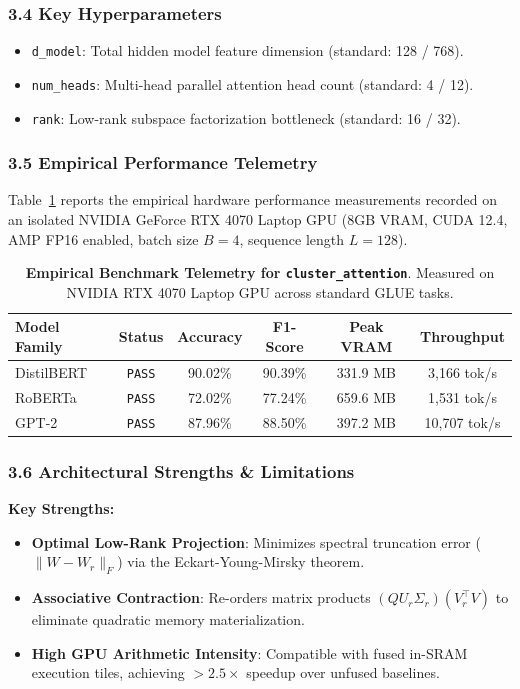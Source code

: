 \subsubsection*{3.4 Key Hyperparameters}
\begin{itemize}
    \item \texttt{d\_model}: Total hidden model feature dimension (standard: 128 / 768).
    \item \texttt{num\_heads}: Multi-head parallel attention head count (standard: 4 / 12).
    \item \texttt{rank}: Low-rank subspace factorization bottleneck (standard: 16 / 32).
\end{itemize}

\subsubsection*{3.5 Empirical Performance Telemetry}
Table~\ref{tab:telemetry_cluster_attention} reports the empirical hardware performance measurements recorded on an isolated NVIDIA GeForce RTX 4070 Laptop GPU (8GB VRAM, CUDA 12.4, AMP FP16 enabled, batch size $B=4$, sequence length $L=128$).

\begin{table}[h]
\centering
\small
\caption{\textbf{Empirical Benchmark Telemetry for \texttt{cluster\_attention}}. Measured on NVIDIA RTX 4070 Laptop GPU across standard GLUE tasks.}
\label{tab:telemetry_cluster_attention}
\begin{tabular*}{\columnwidth}{@{\extracolsep{\fill}}lccccc}
\toprule
\textbf{Model Family} & \textbf{Status} & \textbf{Accuracy} & \textbf{F1-Score} & \textbf{Peak VRAM} & \textbf{Throughput} \\
\midrule
DistilBERT & \texttt{PASS} & 90.02\% & 90.39\% & 331.9 MB & 3,166 tok/s \\
RoBERTa    & \texttt{PASS} & 72.02\% & 77.24\% & 659.6 MB & 1,531 tok/s \\
GPT-2      & \texttt{PASS} & 87.96\% & 88.50\% & 397.2 MB & 10,707 tok/s \\
\bottomrule
\end{tabular*}
\end{table}

\subsubsection*{3.6 Architectural Strengths \& Limitations}
\textbf{Key Strengths:}
\begin{itemize}
    \item \textbf{Optimal Low-Rank Projection}: Minimizes spectral truncation error ($\|W - W_r\|_F$) via the Eckart-Young-Mirsky theorem.
    \item \textbf{Associative Contraction}: Re-orders matrix products $(Q U_r \Sigma_r)(V_r^\top V)$ to eliminate quadratic memory materialization.
    \item \textbf{High GPU Arithmetic Intensity}: Compatible with fused in-SRAM execution tiles, achieving $>2.5\times$ speedup over unfused baselines.
\end{itemize}

